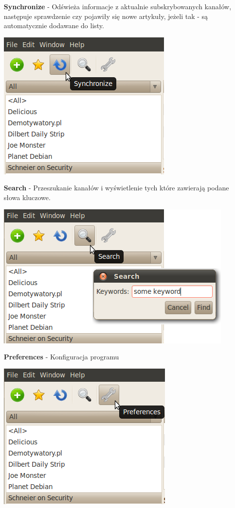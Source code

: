 \documentclass[a4paper,11pt]{report}
\begin{document}
\begin{itemize}
	\newpage
	\item[\textbf{Synchronize}] - Odświeża informacje z aktualnie subskrybowanych kanałów,
		następuje sprawdzenie czy pojawiły się nowe artykuły,
		jeżeli tak - są automatycznie dodawane do listy.
	\begin{center}
		\includegraphics[scale=0.5]{./img/menu_sync.png}
	\end{center}

	\newpage
	\item[\textbf{Search}] - Przeszukanie kanałów i wyświetlenie tych które zawierają podane słowa kluczowe.
	\begin{center}
		\includegraphics[scale=0.5]{./img/menu_search.png}
	\end{center}

	\newpage
	\item[\textbf{Preferences}] - Konfiguracja programu
	\begin{center}
		\includegraphics[scale=0.5]{./img/menu_pref.png}
	\end{center}
\end{itemize}
\end{document}
